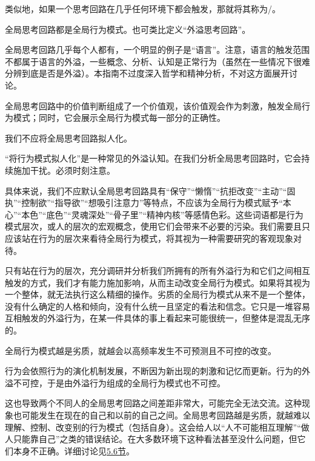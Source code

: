 类似地，如果一个思考回路在几乎任何环境下都会触发，那就将其称为/。
\begin{explain}
全局思考回路都是全局行为模式。也可类比定义“外溢思考回路”。

全局思考回路几乎每个人都有，一个明显的例子是“语言”。注意，语言的触发范围不都属于语言的外溢，一些概念、分析、认知是正常行为（虽然在一些情况下很难分辨到底是否是外溢）。本指南不过度深入哲学和精神分析，不对这方面展开讨论。

全局思考回路中的价值判断组成了一个价值观，该价值观会作为刺激，触发全局行为模式；同时，它会展示全局行为模式每一部分的正确性。
\end{explain}
我们不应将全局思考回路拟人化。
\begin{explain}
“将行为模式拟人化”是一种常见的外溢认知。在我们分析全局思考回路时，它会持续施加干扰。必须时刻注意。

具体来说，我们不应默认全局思考回路具有“保守”“懒惰”“抗拒改变”“主动”“固执”“控制欲”“指导欲”“想吸引注意力”等特点，不应该为全局行为模式赋予“本心”“本色”“底色”“灵魂深处”“骨子里”“精神内核”等感情色彩。这些词语都是行为模式层次，或人的层次的宏观概念，使用它们会带来不必要的污染。我们需要且只应该站在行为的层次来看待全局行为模式，将其视为一种需要研究的客观现象对待。

只有站在行为的层次，充分调研并分析我们所拥有的所有外溢行为和它们之间相互触发的方式，我们才有能力施加影响，从而主动改变全局行为模式。如果将其视为一个整体，就无法执行这么精细的操作。劣质的全局行为模式从来不是一个整体，没有什么确定的人格和倾向，没有什么统一且坚定的看法和信念。它只是一堆容易互相触发的外溢行为，在某一件具体的事上看起来可能很统一，但整体是混乱无序的。
\end{explain}
全局行为模式越是劣质，就越会以高频率发生不可预测且不可控的改变。
\begin{explain}
行为会依照行为的演化机制发展，不断因为新出现的刺激和记忆而更新。行为的外溢不可控，于是由外溢行为组成的全局行为模式也不可控。

这也导致两个不同人的全局思考回路之间差距非常大，可能完全无法交流。这种现象也可能发生在现在的自己和以前的自己之间。全局思考回路越是劣质，就越难以理解、控制、改变别的行为模式（包括自身）。这会给人以“人不可能相互理解”“做人只能靠自己”之类的错误结论。在大多数环境下这种看法甚至没什么问题，但它们本身不正确。详细讨论见\hyperref[sec:假性成长]{5.6节}。
\end{explain}


